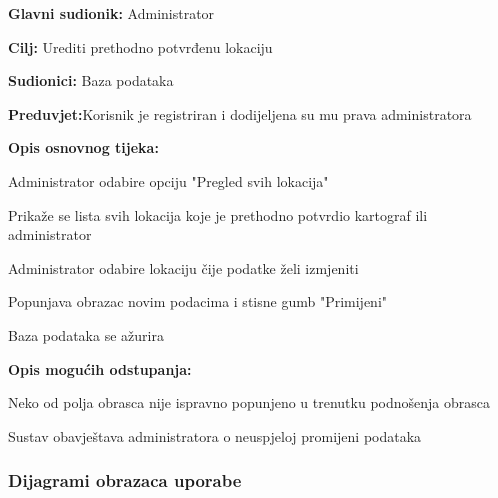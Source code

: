 \noindent {}
\begin{packed_item}
	\item \textbf{Glavni sudionik: }Administrator
	\item  \textbf{Cilj:} Urediti prethodno potvrđenu lokaciju
	\item  \textbf{Sudionici:} Baza podataka
	\item  \textbf{Preduvjet:}Korisnik je registriran i dodijeljena su mu prava administratora
	\item  \textbf{Opis osnovnog tijeka:}
	\item[] \begin{packed_enum}
		\item Administrator odabire opciju "Pregled svih lokacija"
		\item Prikaže se lista svih lokacija koje je prethodno potvrdio kartograf ili administrator
		\item Administrator odabire lokaciju čije podatke želi izmjeniti
		\item Popunjava obrazac novim podacima i stisne gumb "Primijeni"
		\item Baza podataka se ažurira
	\end{packed_enum}
	\item  \textbf{Opis mogućih odstupanja:}
	\item[] \begin{packed_enum}
		\item Neko od polja obrasca nije ispravno popunjeno u trenutku podnošenja obrasca
		\item[] \begin{packed_enum}
			\item Sustav obavještava administratora o neuspjeloj promijeni podataka
		\end{packed_enum}
	\end{packed_enum}
\end{packed_item}


\subsubsection{Dijagrami obrazaca uporabe}

